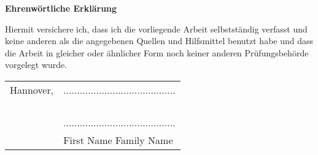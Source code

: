 \pagebreak
\begin{titlepage}

\begin{center}
\textbf{\huge{Ehrenw\"{o}rtliche Erkl\"{a}rung}}
\end{center}

\vspace{3cm}

\noindent Hiermit versichere ich, dass ich die vorliegende Arbeit selbstst\"{a}ndig
verfasst und keine anderen als die angegebenen Quellen und
Hilfsmittel benutzt habe und dass die Arbeit in gleicher oder
\"{a}hnlicher Form noch keiner anderen Pr\"{u}fungsbeh\"{o}rde vorgelegt wurde.



\vspace{5cm}

\hfill
\begin{tabular}{ll}
Hannover, &.........................................\\
\\
\\
\\
\\
  &......................................... \\
  &First Name Family Name \\					%
\end{tabular}



\end{titlepage}
